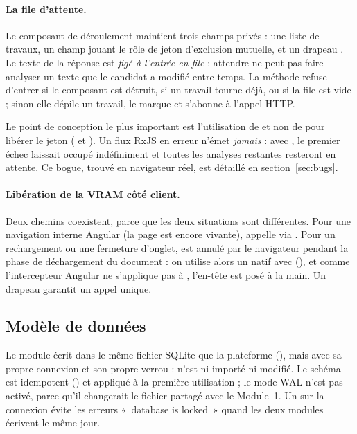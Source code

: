 \paragraph{La file d'attente.} Le composant de déroulement maintient trois
champs privés : une liste  de travaux, un champ 
jouant le rôle de jeton d'exclusion mutuelle, et un drapeau .
Le texte de la réponse est \emph{figé à l'entrée en file} : attendre ne peut
pas faire analyser un texte que le candidat a modifié entre-temps.
La méthode  refuse d'entrer si le composant est détruit, si un
travail tourne déjà, ou si la file est vide ; sinon elle dépile un travail, le
marque  et s'abonne à l'appel HTTP.

Le point de conception le plus important est l'utilisation de
 et non de  pour libérer le jeton
( et ). Un flux RxJS en erreur
n'émet \emph{jamais}  : avec , le premier échec
laissait  occupé indéfiniment et toutes les analyses restantes
resteront en attente. Ce bogue, trouvé en navigateur réel, est détaillé en
section~\ref{sec:bugs}.

\paragraph{Libération de la VRAM côté client.} Deux chemins coexistent, parce
que les deux situations sont différentes. Pour une navigation interne Angular
(la page est encore vivante),  appelle
 via . Pour un rechargement ou une
fermeture d'onglet,  est annulé par le navigateur pendant la
phase de déchargement du document : on utilise alors un  natif avec
 (), et comme
l'intercepteur Angular ne s'applique pas à , l'en-tête
 est posé à la main. Un drapeau  garantit
un appel unique.

\subsection{Modèle de données}
\label{sec:modeles}

Le module écrit dans le même fichier SQLite que la plateforme
(), mais avec sa propre connexion et son propre
verrou :  n'est ni importé ni modifié. Le schéma est idempotent
() et appliqué à la première utilisation ; le
mode WAL n'est pas activé, parce qu'il changerait le fichier partagé avec le
Module~1. Un  sur la connexion évite les erreurs
«~database is locked~» quand les deux modules écrivent le même jour.


